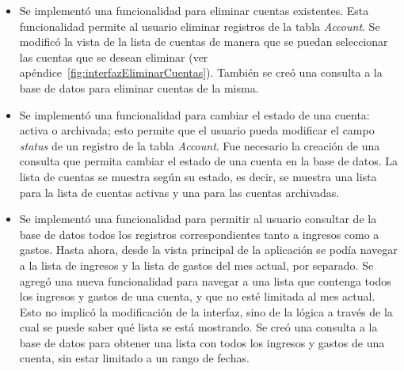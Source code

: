 \begin{itemize}
\item Se implementó una funcionalidad para eliminar cuentas existentes. Esta funcionalidad permite al usuario eliminar registros de la tabla \textit{Account}. Se modificó la vista de la lista de cuentas de manera que se puedan seleccionar las cuentas que se desean eliminar (ver apéndice~\ref{fig:interfazEliminarCuentas}). También se creó una consulta a la base de datos para eliminar cuentas de la misma.
\item Se implementó una funcionalidad para cambiar el estado de una cuenta: activa o archivada; esto permite que el usuario pueda modificar el campo \textit{status} de un registro de la tabla \textit{Account}. Fue necesario la creación de una consulta que permita cambiar el estado de una cuenta en la base de datos. La lista de cuentas se muestra según su estado, es decir, se muestra una lista para la lista de cuentas activas y una para las cuentas archivadas. 
\item Se implementó una funcionalidad para permitir al usuario consultar de la base de datos todos los registros correspondientes tanto a ingresos como a gastos. Hasta ahora, desde la vista principal de la aplicación se podía navegar a la lista de ingresos y la lista de gastos del mes actual, por separado. Se agregó una nueva funcionalidad para navegar a una lista que contenga todos los ingresos y gastos de una cuenta, y que no esté limitada al mes actual. Esto no implicó la modificación de la interfaz, sino de la lógica a través de la cual se puede saber qué lista se está mostrando. Se creó una consulta a la base de datos para obtener una lista con todos los ingresos y gastos de una cuenta, sin estar limitado a un rango de fechas.
\end{itemize}
%
%
%
